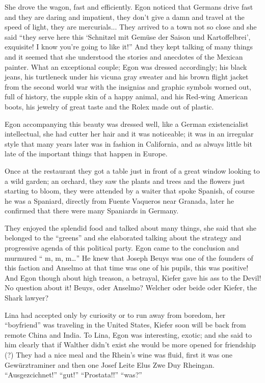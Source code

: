 \documentclass[smalldemyvopaper,11pt,twoside,onecolumn,openright,extrafontsizes]{memoir}
\begin{document}
She drove the wagon, fast and efficiently. Egon noticed that Germans drive fast and they are daring and impatient, they don’t give a damn and travel at the speed of light, they are mercurials... They arrived to a town not so close and she said “they serve here  this ‘Schnitzel mit Gemüse der Saison und Kartoffelbrei’, exquisite! I know you’re going to like it!” And they kept talking of many things and it seemed that she understood the stories and anecdotes of the Mexican painter. What an exceptional couple; Egon was dressed accordingly; his black jeans, his turtleneck under his vicuna gray sweater and his brown flight jacket from the second world war with the insignias and graphic symbols worned out, full of history, the supple skin of a happy animal, and his Red-wing American boots, his jewelry of great taste and the Rolex made out of plastic.

Egon accompanying this beauty was dressed well, like a German existencialist intellectual, she had cutter her hair and it was noticeable; it was in an irregular style that many years later was in fashion in California, and as always little bit late of the important things that happen in Europe.

Once at the restaurant they got a table just in front of a great window looking to a wild garden; an orchard, they saw the plants and trees and the flowers just starting to bloom, they were attended by a waiter that spoke Spanish, of course he was a Spaniard, directly from Fuente Vaqueros near Granada, later he confirmed that there were many Spaniards in Germany.

They enjoyed the splendid food and talked about many things, she said that she belonged to the “greens” and she elaborated talking about the strategy and progressive agenda of this political party. Egon came to the conclusion and murmured “ m, m, m…” He knew that Joseph Beuys was one of the founders of this faction and Anselmo at that time was one of his pupils, this was positive! And Egon though about high treason, a betrayal, Kiefer gave his ass to the Devil! No question about it! Beuys, oder Anselmo? Welcher oder beide oder Kiefer, the Shark lawyer?

Lina had accepted only by curiosity or to run away from boredom, her “boyfriend” was traveling in the United States, Kiefer soon will be back from remote China and India. To Lina, Egon was interesting, exotic; and she said to him clearly that if Walther didn’t exist she would be more opened for friendship (?) They had a nice meal and the Rhein’s wine was fluid, first it was one Gewürztraminer and then one Josef Leite Elus Zwe Duy Rheingan. “Ausgezcichnet!” “gut!” “Prostata!!” “was?”
\end{document}
